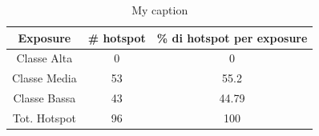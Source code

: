 \begin{table}[H]
	\centering
	\caption{My caption}
	\label{risultati_roma_pescara}
	\begin{tabular}{|c|c|c|}
		\hline
		\rowcolor[HTML]{C0C0C0} 
		\textbf{Exposure} & \textbf{\# hotspot} & \textbf{\% di hotspot per exposure} \\ \hline
		Classe Alta       & 0                  & 0                                   \\ \hline
		Classe Media      & 53                  & 55.2                               \\ \hline
		Classe Bassa      & 43                & 44.79                               \\ \hline
		Tot. Hotspot      & 96                & 100                                 \\ \hline
	\end{tabular}
\end{table}


